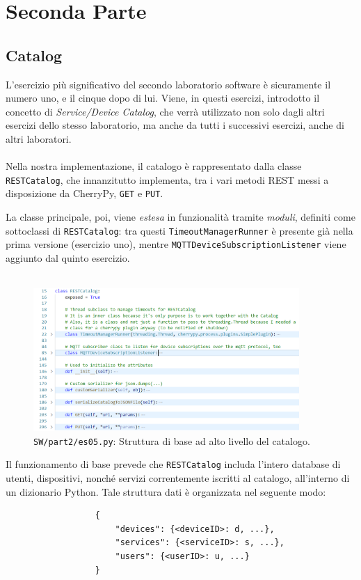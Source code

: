 \documentclass[12pt,a4paper]{article}
\begin{document}
\section{Seconda Parte}

\subsection{Catalog}

L'esercizio più significativo del secondo laboratorio software è sicuramente il numero uno, e il cinque dopo di lui. Viene, in questi esercizi, introdotto il concetto di \textit{Service/Device Catalog}, che verrà utilizzato non solo dagli altri esercizi dello stesso laboratorio, ma anche da tutti i successivi esercizi, anche di altri laboratori.
\\ \\
Nella nostra implementazione, il catalogo è rappresentato dalla classe \verb|RESTCatalog|, che innanzitutto implementa, tra i vari metodi REST messi a disposizione da CherryPy, \verb|GET| e \verb|PUT|.

La classe principale, poi, viene \textit{estesa} in funzionalità tramite \textit{moduli}, definiti come sottoclassi di \verb|RESTCatalog|: tra questi \verb|TimeoutManagerRunner| è presente già nella prima versione (esercizio uno), mentre \verb|MQTTDeviceSubscriptionListener| viene aggiunto dal quinto esercizio.
\\ \\
\begin{figure}[htbp]
    \centering
    \includegraphics[width=0.9\textwidth]{catalog.png}
    \caption*{\texttt{SW/part2/es05.py}: Struttura di base ad alto livello del catalogo.}
    \label{fig:catalog}
\end{figure}
Il funzionamento di base prevede che \verb|RESTCatalog| includa l'intero database di utenti, dispositivi, nonché servizi correntemente iscritti al catalogo, all'interno di un dizionario Python. Tale struttura dati è organizzata nel seguente modo:
\begin{verbatim}
                  {
                      "devices": {<deviceID>: d, ...},
                      "services": {<serviceID>: s, ...},
                      "users": {<userID>: u, ...}
                  }
\end{verbatim}
\end{document}
